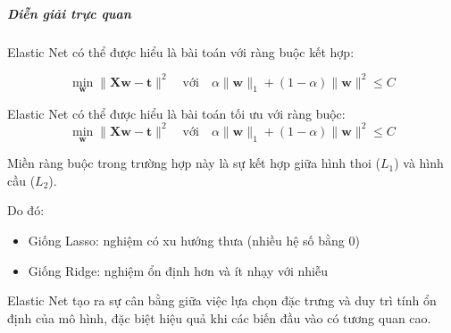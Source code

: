 \subparagraph{Diễn giải trực quan}

Elastic Net có thể được hiểu là bài toán với ràng buộc kết hợp:

\begin{equation}
  \min_{\boldsymbol{w}} \|\boldsymbol{X}\boldsymbol{w} - \boldsymbol{t}\|^2
  \quad \text{với} \quad
  \alpha \|\boldsymbol{w}\|_1 + (1-\alpha)\|\boldsymbol{w}\|^2 \leq C
\end{equation}

Elastic Net có thể được hiểu là bài toán tối ưu với ràng buộc:
\begin{equation}
  \min_{\boldsymbol{w}} \|\boldsymbol{X}\boldsymbol{w} - \boldsymbol{t}\|^2
  \quad \text{với} \quad
  \alpha \|\boldsymbol{w}\|_1 + (1 - \alpha)\|\boldsymbol{w}\|^2 \leq C
\end{equation}

Miền ràng buộc trong trường hợp này là sự kết hợp giữa hình thoi ($L_1$) và
hình cầu ($L_2$).

Do đó:
\begin{itemize}
  \item Giống Lasso: nghiệm có xu hướng thưa (nhiều hệ số bằng 0)
  \item Giống Ridge: nghiệm ổn định hơn và ít nhạy với nhiễu
\end{itemize}

Elastic Net tạo ra sự cân bằng giữa việc lựa chọn đặc trưng và duy trì tính ổn
định của mô hình, đặc biệt hiệu quả khi các biến đầu vào có tương quan cao.
